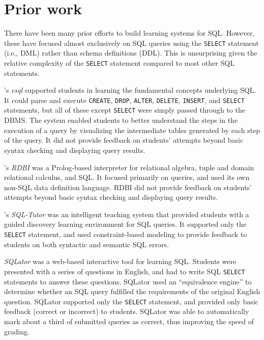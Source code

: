\documentclass[sigconf, authordraft]{acmart}
\begin{document}
\section{Prior work}
\label{sec-literature}

There have been many prior efforts to build learning systems for SQL. However, these have focused almost exclusively on SQL queries using the \texttt{SELECT} statement (i.e., DML) rather than schema definitions (DDL). This is unsurprising given the relative complexity of the \texttt{SELECT} statement compared to most other SQL statements.

\citeauthor{Kearns.R-1997a-A-teaching}'s \emph{esql} \cite{Kearns.R-1997a-A-teaching} supported students in learning the fundamental concepts underlying SQL. It could parse and execute \texttt{CREATE}, \texttt{DROP}, \texttt{ALTER}, \texttt{DELETE}, \texttt{INSERT}, and \texttt{SELECT} statements, but all of these except \texttt{SELECT} were simply passed through to the DBMS. The system enabled students to better understand the steps in the execution of a query by visualizing the intermediate tables generated by each step of the query. It did not provide feedback on students' attempts beyond basic syntax checking and displaying query results.

\citeauthor{Dietrich.S-1993a-An-educational}'s \emph{RDBI} \cite{Dietrich.S-1993a-An-educational} was a Prolog-based interpreter for relational algebra, tuple and domain relational calculus, and SQL. It focused primarily on queries, and used its own non-SQL data definition language. RDBI did not provide feedback on students' attempts beyond basic syntax checking and displaying query results. 

\citeauthor{Mitrovic.A-1998a-Learning}'s \emph{SQL-Tutor} \cite{Mitrovic.A-1998a-Learning} was an intelligent teaching system  that provided students with a guided discovery learning environment for SQL queries. It supported only the \texttt{SELECT} statement, and used constraint-based modeling \cite{Ohlsson.S-1992a-Constraint-based,Ohlsson.S-2016a-Constraint-based} to provide feedback to students on both syntactic and semantic SQL errors.

\citeauthor{Sadiq.S-2004a-SQLator} \emph{SQLator} \cite{Sadiq.S-2004a-SQLator} was a web-based interactive tool for learning SQL. Students were presented with a series of questions in English, and had to write SQL \texttt{SELECT} statements to answer these questions. SQLator used an ``equivalence engine'' to determine whether an SQL query fulfilled the requirements of the original English question. SQLator supported only the \texttt{SELECT} statement, and provided only basic feedback (correct or incorrect) to students. SQLator was able to automatically mark about a third of submitted queries as correct, thus improving the speed of grading. 
\end{document}
